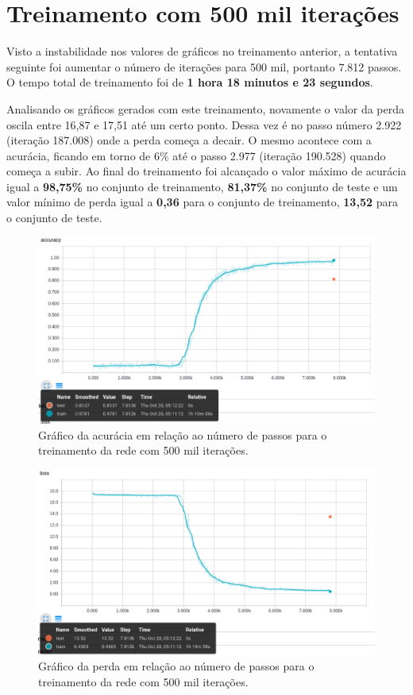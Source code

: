 \section{Treinamento com 500 mil iterações}

Visto a instabilidade nos valores de gráficos no treinamento anterior,
a tentativa seguinte foi aumentar o número de iterações para 500 mil,
portanto 7.812 passos. O tempo total de treinamento foi de {\bf 1 hora
18 minutos e 23 segundos}.

Analisando os gráficos gerados com este treinamento, novamente o valor
da perda oscila entre 16,87 e 17,51 até um certo ponto. Dessa vez
é no passo número 2.922 (iteração 187.008) onde a perda começa a
decair. O mesmo acontece com a acurácia, ficando em torno de 6\% até o
passo 2.977 (iteração 190.528) quando começa a subir. Ao final do
treinamento foi alcançado o valor máximo de acurácia igual a {\bf
  98,75\%} no conjunto de treinamento, {\bf 81,37\%} no conjunto de
teste e um valor mínimo de perda igual a {\bf 0,36} para o conjunto de
treinamento, {\bf 13,52} para o conjunto de teste.

\begin{figure}[H]
\centering
\includegraphics[scale=0.4]{imagens/accuracy_500k}
\caption{Gráfico da acurácia em relação ao número de passos para o
  treinamento da rede com 500 mil iterações.}
\label{fig:accuracy_500k}
\end{figure}

\begin{figure}[H]
\centering
\includegraphics[scale=0.4]{imagens/loss_500k}
\caption{Gráfico da perda em relação ao número de passos para o
  treinamento da rede com 500 mil iterações.}
\label{fig:loss_500k}
\end{figure}

